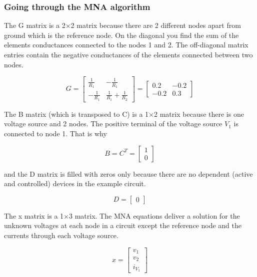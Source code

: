 \subsubsection{Going through the MNA algorithm}

The G matrix is a 2$\times$2 matrix because there are 2 different
nodes apart from ground which is the reference node.  On the diagonal
you find the sum of the elements conductances connected to the nodes 1
and 2.  The off-diagonal matrix entries contain the negative
conductances of the elements connected between two nodes.

\begin{equation}
G =
\begin{bmatrix}
\frac{1}{R_{1}} & -\frac{1}{R_{1}}\\
-\frac{1}{R_{1}} & \frac{1}{R_{1}} + \frac{1}{R_{2}}
\end{bmatrix}
=
\begin{bmatrix}
0.2 & -0.2\\
-0.2 & 0.3
\end{bmatrix}
\end{equation}

The B matrix (which is transposed to C) is a 1$\times$2 matrix because
there is one voltage source and 2 nodes.  The positive terminal of the
voltage source $V_{1}$ is connected to node 1.  That is why

\begin{equation}
B = C^{T} =
\begin{bmatrix}
1\\
0
\end{bmatrix}
\end{equation}

and the D matrix is filled with zeros only because there are no dependent
(active and controlled) devices in the example circuit.

\begin{equation}
D =
\begin{bmatrix}
0
\end{bmatrix}
\end{equation}

The x matrix is a 1$\times$3 matrix.  The MNA equations deliver a
solution for the unknown voltages at each node in a circuit except the
reference node and the currents through each voltage source.

\begin{equation}
x =
\begin{bmatrix}
v_{1}\\
v_{2}\\
i_{V_{1}}
\end{bmatrix}
\end{equation}

